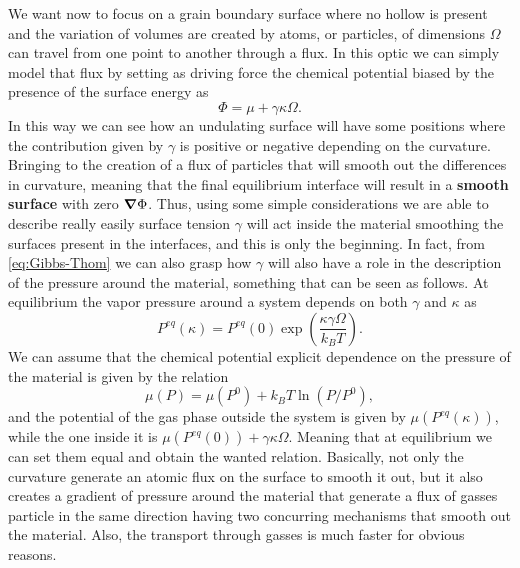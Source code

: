 We want now to focus on a grain boundary surface where no hollow is present and the variation of volumes are created by atoms, or particles, of dimensions $\Omega$ can travel from one point to another through a flux. In this optic we can simply model that flux by setting as driving force the chemical potential biased by the presence of the surface energy as
\begin{equation}
    \Phi = \mu + \gamma\kappa\Omega.
\end{equation}
In this way we can see how an undulating surface will have some positions where the contribution given by $\gamma$ is positive or negative depending on the curvature. Bringing to the creation of a flux of particles that will smooth out the differences in curvature, meaning that the final equilibrium interface will result in a \textbf{smooth surface} with zero $\grad \Phi$. Thus, using some simple considerations we are able to describe really easily surface tension $\gamma$ will act inside the material smoothing the surfaces present in the interfaces, and this is only the beginning. In fact, from \eqref{eq:Gibbs-Thom} we can also grasp how $\gamma$ will also have a role in the description of the pressure around the material, something that can be seen as follows.
{
    At equilibrium the vapor pressure around a system depends on both $\gamma$ and $\kappa$ as
    \begin{equation}
        P^{eq}(\kappa) = P^{eq}(0)\exp\left( \frac{\kappa\gamma\Omega}{k_BT} \right).
    \end{equation}
}
{
    We can assume that the chemical potential explicit dependence on the pressure of the material is given by the relation
    \begin{equation}
        \mu(P) = \mu(P^0) + k_BT\ln(P/P^0),
    \end{equation}
    and the potential of the gas phase outside the system is given by $\mu(P^{eq}(\kappa))$, while the one inside it is $\mu(P^{eq}(0)) + \gamma\kappa\Omega$. Meaning that at equilibrium we can set them equal and obtain the wanted relation.
}
\noindent
Basically, not only the curvature generate an atomic flux on the surface to smooth it out, but it also creates a gradient of pressure around the material that generate a flux of gasses particle in the same direction having two concurring mechanisms that smooth out the material. Also, the transport through gasses is much faster for obvious reasons.

